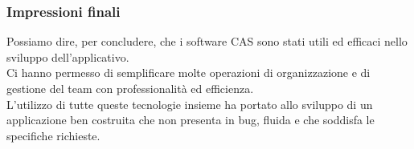\documentclass{beamer}
\begin{document}
\begin{frame}
\frametitle{Impressioni finali}
Possiamo dire, per concludere, che i software CAS sono stati utili ed efficaci nello sviluppo dell'applicativo. \\
Ci hanno permesso di semplificare molte operazioni di organizzazione e di gestione del team con professionalità ed efficienza.\\
L'utilizzo di tutte queste tecnologie insieme ha portato allo sviluppo di un applicazione ben costruita che non presenta in bug,  fluida e che soddisfa le specifiche richieste.
\end{frame}
\end{document}
